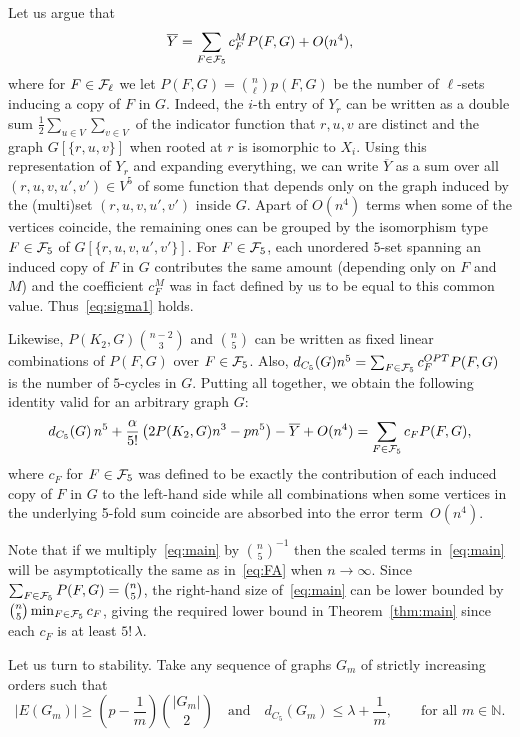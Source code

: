 \documentclass[12pt]{article}
\theoremstyle{definition}
\theoremstyle{remark}
\newcommand{\C}[1]{{\protect\mathcal{#1}}}
\renewcommand{\O}[1]{\overline{#1}}
\newcommand{\I}[1]{{\mathbb #1}}
\renewcommand{\ge}{\geqslant}
\renewcommand{\le}{\leqslant}
\begin{document}
Let us argue that
 \begin{equation}\label{eq:sigma1}
 \O{Y}=\sum_{F\in\C F_5} c_F^M P(F,G)+O(n^4),
 \end{equation}
 where for $F\in\C F_\ell$ we let $P(F,G)={n\choose \ell} p(F,G)$ be the number of $\ell$-sets inducing a copy of $F$ in $G$. Indeed, the $i$-th entry of $Y_r$ can be  written as a double sum $\frac12 \sum_{u\in V}\sum_{v\in V}$ of the indicator function that $r,u,v$ are distinct and the graph $G[\{r,u,v\}]$ when rooted at $r$ is isomorphic to $X_i$. Using this representation of $Y_r$ and expanding everything, we can write $\O{Y}$ as a sum over all $(r,u,v,u',v')\in V^5$ of some function that depends only on the graph induced by the (multi)set $(r,u,v,u',v')$ inside $G$. Apart of $O(n^4)$ terms when some of the vertices coincide, the remaining ones can be grouped by the isomorphism type $F\in\C F_5$ of $G[\{r,u,v,u',v'\}]$. For $F\in\C F_5$, each unordered $5$-set spanning an induced copy of $F$ in $G$ contributes the same amount (depending only on $F$ and $M$) and the coefficient $c_F^M$ was in fact defined by us to be equal to this common value. Thus~\eqref{eq:sigma1} holds.

Likewise, $P(K_2,G){n-2\choose 3}$ and ${n\choose 5}$ can be written as fixed linear combinations of $P(F,G)$ over $F\in\C F_5$. Also, $d_{C_5}(G)n^5=\sum_{F\in\C F_5} c_F^{OPT} P(F,G)$ is the number of $5$-cycles in $G$. Putting all together, we obtain the following identity valid for an arbitrary graph $G$:
 \begin{equation}\label{eq:main}
 d_{C_5}(G)\,n^5 +\frac{\alpha}{5!}\left(2P(K_2,G)n^3-pn^5\right)-\O{Y}+O(n^4)
 =\sum_{F\in\C F_5} c_F P(F,G),
 \end{equation}
  where $c_F$ for $F\in\C F_5$ was defined to be exactly the contribution of each induced copy of $F$ in $G$ to the left-hand side while  all combinations when some vertices in the underlying 5-fold sum coincide are absorbed into the error term~$O(n^4)$.
  
  
 Note that if we multiply~\eqref{eq:main} by ${n\choose 5}^{-1}$ then the scaled terms in~\eqref{eq:main} will be asymptotically the same as in~\eqref{eq:FA} when $n\to\infty$. Since $\sum_{F\in\C F_5} P(F,G)={n\choose 5}$, the right-hand size of~\eqref{eq:main} can be lower bounded by ${n\choose 5}\min_{F\in\C F_5} c_F$, giving the required lower bound in Theorem~\ref{thm:main} since each $c_F$ is at least $5!\, \lambda$.

Let us turn to stability. Take any sequence of graphs $G_m$ of strictly increasing orders 
such that 
\begin{equation}\label{eq:Gm}
|E(G_m)|\ge \left(p-\frac 1m\right){|G_m|\choose 2}\quad\mbox{and}\quad d_{C_5}(G_{m})\le \lambda+\frac1m,\qquad \mbox{for all }m\in\I N.
\end{equation}
\end{document}
